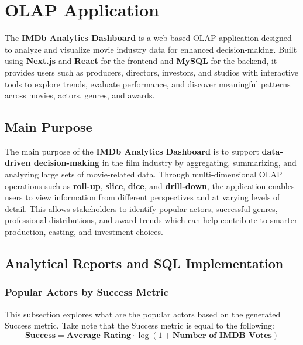\documentclass[sigconf, pbalance]{acmart}
\begin{document}





\section{OLAP Application} \label{olap}

The \textbf{IMDb Analytics Dashboard} is a web-based OLAP application designed to analyze and visualize movie industry data for enhanced decision-making. Built using \textbf{Next.js} and \textbf{React} for the frontend and \textbf{MySQL} for the backend, it provides users such as producers, directors, investors, and studios with interactive tools to explore trends, evaluate performance, and discover meaningful patterns across movies, actors, genres, and awards.

\subsection{Main Purpose}

The main purpose of the \textbf{IMDb Analytics Dashboard} is to support \textbf{data-driven decision-making} in the film industry by aggregating, summarizing, and analyzing large sets of movie-related data. Through multi-dimensional OLAP operations such as \textbf{roll-up}, \textbf{slice}, \textbf{dice}, and \textbf{drill-down}, the application enables users to view information from different perspectives and at varying levels of detail. This allows stakeholders to identify popular actors, successful genres, professional distributions, and award trends which can help contribute to smarter production, casting, and investment choices.


\subsection{Analytical Reports and SQL Implementation}

\subsubsection{Popular Actors by Success Metric}

This subsection explores what are the popular actors based on the generated Success metric. Take note that the Success metric is equal to the following:
$$
\textbf{Success} = \textbf{Average Rating} \cdot \log(1 + \textbf{Number of IMDB Votes})
$$
\end{document}
